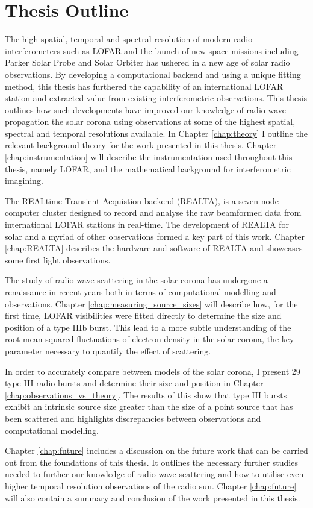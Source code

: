 \section{Thesis Outline}
The high spatial, temporal and spectral resolution of modern radio interferometers such as LOFAR and the launch of new space missions including Parker Solar Probe \citep[PSP;][]{Fox2016} and Solar Orbiter \citep{Muller2020} has ushered in a new age of solar radio observations. By developing a computational backend and using a unique fitting method, this thesis has furthered the capability of an international LOFAR station and extracted value from existing interferometric observations. This thesis outlines how such developments have improved our knowledge of radio wave propagation the solar corona using observations at some of the highest spatial, spectral and temporal resolutions available. In Chapter \ref{chap:theory} I outline the relevant background theory for the work presented in this thesis. Chapter \ref{chap:instrumentation} will describe the instrumentation used throughout this thesis, namely LOFAR, and the mathematical background for interferometric imagining. 

The REALtime Transient Acquistion backend (REALTA), is a seven node computer cluster designed to record and analyse the raw beamformed data from international LOFAR stations in real-time. The development of REALTA for solar and a myriad of other observations formed a key part of this work. Chapter \ref{chap:REALTA} describes the hardware and software of REALTA and showcases some first light observations.
 
The study of radio wave scattering in the solar corona has undergone a renaissance in recent years both in terms of computational modelling and observations. Chapter \ref{chap:measuring_source_sizes} will describe how, for the first time, LOFAR visibilities were fitted directly to determine the size and position of a type IIIb burst. This lead to a more subtle understanding of the root mean squared fluctuations of electron density in the solar corona, the key parameter necessary to quantify the effect of scattering. 

In order to accurately compare between models of the solar corona, I present 29 type III radio bursts and determine their size and position in Chapter \ref{chap:observations_vs_theory}. The results of this show that type III bursts exhibit an intrinsic source size greater than the size of a point source that has been scattered and highlights discrepancies between observations and computational modelling.

Chapter \ref{chap:future} includes a discussion on the future work that can be carried out from the foundations of this thesis. It outlines the necessary further studies needed to further our knowledge of radio wave scattering and how to utilise even higher temporal resolution observations of the radio sun. Chapter \ref{chap:future} will also contain a summary and conclusion of the work presented in this thesis.


